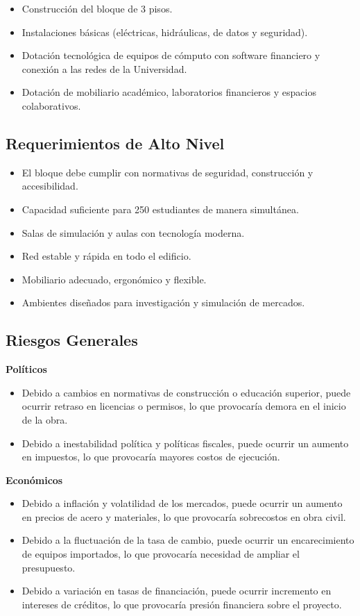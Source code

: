 \begin{itemize}
    \item Construcción del bloque de 3 pisos.
    \item Instalaciones básicas (eléctricas, hidráulicas, de datos y seguridad).
    \item Dotación tecnológica de equipos de cómputo con software financiero y conexión a las redes de la Universidad.
    \item Dotación de mobiliario académico, laboratorios financieros y espacios colaborativos.
\end{itemize}

\subsection{Requerimientos de Alto Nivel}

\begin{itemize}
    \item El bloque debe cumplir con normativas de seguridad, construcción y accesibilidad.
    \item Capacidad suficiente para 250 estudiantes de manera simultánea.
    \item Salas de simulación y aulas con tecnología moderna.
    \item Red estable y rápida en todo el edificio.
    \item Mobiliario adecuado, ergonómico y flexible.
    \item Ambientes diseñados para investigación y simulación de mercados.
\end{itemize}

\subsection{Riesgos Generales}

\textbf{Políticos}
\begin{itemize}
    \item Debido a cambios en normativas de construcción o educación superior, puede ocurrir retraso en licencias o permisos, lo que provocaría demora en el inicio de la obra.
    \item Debido a inestabilidad política y políticas fiscales, puede ocurrir un aumento en impuestos, lo que provocaría mayores costos de ejecución.
\end{itemize}

\textbf{Económicos}
\begin{itemize}
    \item Debido a inflación y volatilidad de los mercados, puede ocurrir un aumento en precios de acero y materiales, lo que provocaría sobrecostos en obra civil.
    \item Debido a la fluctuación de la tasa de cambio, puede ocurrir un encarecimiento de equipos importados, lo que provocaría necesidad de ampliar el presupuesto.
    \item Debido a variación en tasas de financiación, puede ocurrir incremento en intereses de créditos, lo que provocaría presión financiera sobre el proyecto.
\end{itemize}

